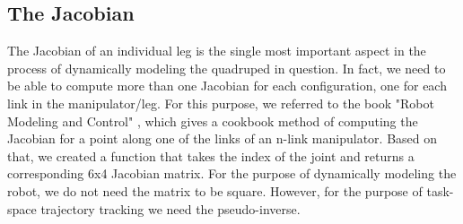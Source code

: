 \subsection{The Jacobian}
The Jacobian of an individual leg is the single most important aspect in the process of dynamically modeling the quadruped in question. In fact, we need to be able to compute more than one Jacobian for each configuration, one for each link in the manipulator/leg.
For this purpose, we referred to the book "Robot Modeling and Control" \cite{spong2006robot}, which gives a cookbook method of computing the Jacobian for a point along one of the links of an n-link manipulator. Based on that, we created a function that takes the index of the joint and returns a corresponding 6x4 Jacobian matrix. For the purpose of dynamically modeling the robot, we do not need the matrix to be square. However, for the purpose of task-space trajectory tracking we need the pseudo-inverse.

